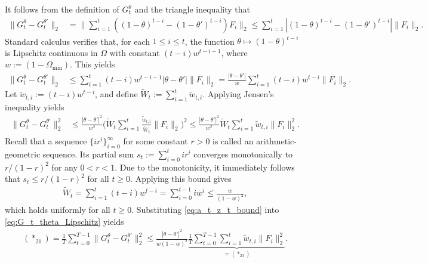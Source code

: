 \documentclass[a4paper, 11pt]{article}
\theoremstyle{definition}
\begin{document}
It follows from the definition of $G_t^\theta$ and the triangle inequality that
\begin{align}
    \big\| G_t^\theta - G_t^{\theta'} \big\|_2 & = \bigg\| \sum_{i=1}^{t} \left( ( 1 - \theta )^{t-i} - ( 1 - \theta' )^{t-i} \right) F_i \bigg\|_2 \le \sum_{i=1}^{t} \left| ( 1 - \theta )^{t-i} - ( 1 - \theta' )^{t-i} \right| \| F_i \|_2. 
\end{align}
Standard calculus verifies that, for each $1 \le i \le t$, the function $\theta \mapsto (1 - \theta)^{t-i}$ is Lipschitz continuous in $\Omega$ with constant $(t-i) w^{t-i-1}$, where $w := (1 - \Omega_{\text{min}})$.
This yields
\begin{align}
    \big\| G_t^\theta - G_t^{\theta'} \big\|_2 & \le \sum_{i=1}^{t} (t-i) w^{t-i-1} \left| \theta - \theta' \right| \| F_i \|_2 = \frac{\left| \theta - \theta' \right|}{w} \sum_{i=1}^{t} (t-i) w^{t-i} \| F_i \|_2 .
\end{align}
Let $\tilde{w}_{t,i} := (t-i) w^{t-i}$, and define $\tilde{W}_t := \sum_{i=1}^{t} \tilde{w}_{t,i}$.
Applying Jensen's inequality yields
\begin{align}
    \big\| G_t^\theta - G_t^{\theta'} \big\|_2^2 & \le \frac{\left| \theta - \theta' \right|^2}{w^2} \bigg( \tilde{W}_t \sum_{i=1}^{t} \frac{ \tilde{w}_{t,i} }{ \tilde{W}_t } \| F_i \|_2 \bigg)^2 \le \frac{ \left| \theta - \theta' \right|^2 }{ w^2 } \tilde{W}_t \sum_{i=1}^{t} \tilde{w}_{t,i} \| F_i \|_2^2 . \label{eq:G_t_theta_Lipschitz}
\end{align}
Recall that a sequence $\{i r^i \}_{i=0}^{\infty}$ for some constant $r > 0$ is called an arithmetic-geometric sequence.
Its partial sum $s_t := \sum_{i=0}^{t} ir^i$ converges monotonically to $r / (1 - r)^2$ for any $0 < r < 1$.
Due to the monotonicity, it immediately follows that $s_t \le r / (1 - r)^2$ for all $t \ge 0$.
Applying this bound gives
\begin{align}
	\tilde{W}_t = \sum_{i=1}^{t} (t-i) w^{t-i} = \sum_{i=0}^{t-1} i w^i \le \frac{w}{(1 - w)^2} , \label{eq:a_t_z_t_bound}
\end{align}
which holds uniformly for all $t \ge 0$.
Substituting \eqref{eq:a_t_z_t_bound} into \eqref{eq:G_t_theta_Lipschitz} yields
\begin{align}
    (*_{21}) = \frac{1}{T} \sum_{t=0}^{T-1} \big\| G_t^\theta - G_t^{\theta'} \big\|_2^2 \le \frac{ \left| \theta - \theta' \right|^2 }{ w (1 - w)^2 } \underbrace{ \frac{1}{T} \sum_{t=0}^{T-1} \sum_{i=1}^{t} \tilde{w}_{t,i} \| F_i \|_2^2 }_{ = (*_{23}) } . \label{eq:lipchitz A_theta}
\end{align}
\end{document}
